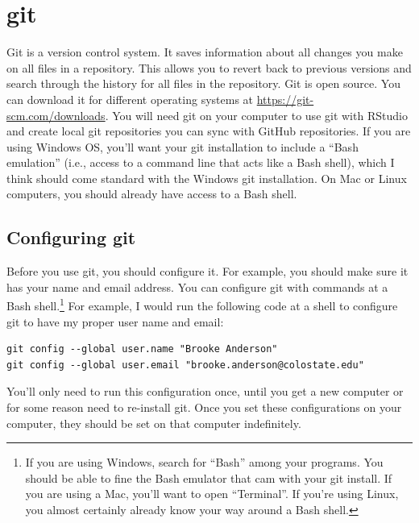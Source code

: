 \documentclass[]{tufte-book}
\begin{document}
\hypertarget{git}{%
\section{git}\label{git}}

Git is a version control system. It saves information about all changes you make
on all files in a repository. This allows you to revert back to previous
versions and search through the history for all files in the repository. Git is
open source. You can download it for different operating systems at
\url{https://git-scm.com/downloads}. You will need git on your computer to use git
with RStudio and create local git repositories you can sync with GitHub
repositories. If you are using Windows OS, you'll want your git installation to
include a ``Bash emulation'' (i.e., access to a command line that acts like a Bash
shell), which I think should come standard with the Windows git installation.
On Mac or Linux computers, you should already have access to a Bash shell.

\hypertarget{configuring-git}{%
\subsection{Configuring git}\label{configuring-git}}

Before you use git, you should configure it. For example, you should make sure
it has your name and email address. You can configure git with commands at a
Bash shell.\footnote{If you are using Windows, search for ``Bash'' among your programs.
  You should be able to fine the Bash emulator that cam with your git install. If
  you are using a Mac, you'll want to open ``Terminal''. If you're using Linux, you
  almost certainly already know your way around a Bash shell.} For example, I
would run the following code at a shell to configure git to have my proper user
name and email:

\begin{verbatim}
git config --global user.name "Brooke Anderson"
git config --global user.email "brooke.anderson@colostate.edu"
\end{verbatim}

You'll only need to run this configuration once, until you get a new computer or
for some reason need to re-install git. Once you set these configurations on
your computer, they should be set on that computer indefinitely.
\end{document}
